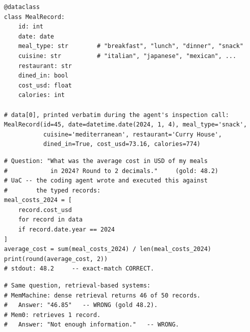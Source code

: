 \begin{lstlisting}[caption={The analytical dining state ($N{=}50$). Each record is a typed \texttt{MealRecord} dataclass instance; the instance below is the verbatim \texttt{repr} our agent printed when it inspected \texttt{data[0]} during the run.},label={lst:app-analytical-state}]
@dataclass
class MealRecord:
    id: int
    date: date
    meal_type: str        # "breakfast", "lunch", "dinner", "snack"
    cuisine: str          # "italian", "japanese", "mexican", ...
    restaurant: str
    dined_in: bool
    cost_usd: float
    calories: int

# data[0], printed verbatim during the agent's inspection call:
MealRecord(id=45, date=datetime.date(2024, 1, 4), meal_type='snack',
           cuisine='mediterranean', restaurant='Curry House',
           dined_in=True, cost_usd=73.16, calories=774)
\end{lstlisting}
\vspace{-0.5em}
\begin{lstlisting}[caption={UaC answer trace, verbatim from our run. The agent's first attempt filtered on a non-existent \texttt{type} field and printed nothing; it inspected a record (Listing~\ref{lst:app-analytical-state}), dropped the bad filter, and re-ran. The corrected code below is what produced the answer---a concrete instance of the generate--verify--review loop.},label={lst:app-analytical-uac}]
# Question: "What was the average cost in USD of my meals
#            in 2024? Round to 2 decimals."     (gold: 48.2)
# UaC -- the coding agent wrote and executed this against
#        the typed records:
meal_costs_2024 = [
    record.cost_usd
    for record in data
    if record.date.year == 2024
]
average_cost = sum(meal_costs_2024) / len(meal_costs_2024)
print(round(average_cost, 2))
# stdout: 48.2     -- exact-match CORRECT.
\end{lstlisting}
\vspace{-0.5em}
\begin{lstlisting}[caption={Retrieval baselines on the same question, predictions verbatim from our run. Even retrieving 46 of the 50 records, MemMachine misses the average; the four dropped records shift the mean. Top-$k$ retrieval cannot guarantee the full population, and an average needs every record.},label={lst:app-analytical-mm}]
# Same question, retrieval-based systems:
# MemMachine: dense retrieval returns 46 of 50 records.
#   Answer: "46.85"   -- WRONG (gold 48.2).
# Mem0: retrieves 1 record.
#   Answer: "Not enough information."   -- WRONG.
\end{lstlisting}

